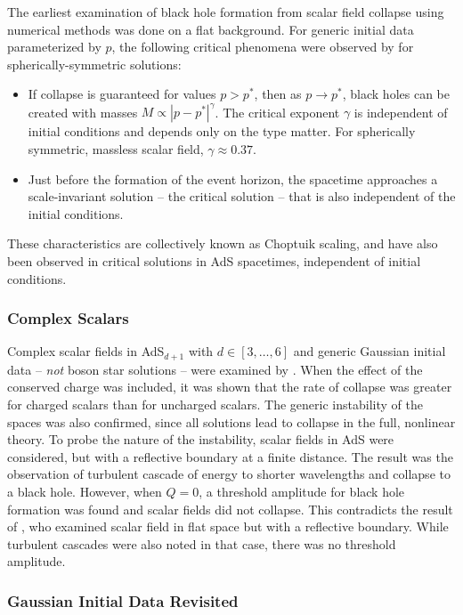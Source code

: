 \documentclass[../PhD.tex]{subfiles}
\begin{document}
The earliest examination of black hole formation from scalar field collapse using numerical methods was done on a flat background. For generic initial data parameterized by $p$, the following critical phenomena were observed by \cite{Choptuik:1992jv} for spherically-symmetric solutions:
\begin{itemize}
\item If collapse is guaranteed for values $p > p^*$, then as $p \to p^*$, black holes can be created with masses $M \propto |p - p^*|^\gamma$. The critical exponent $\gamma$ is independent of initial conditions and depends only on the type matter. For spherically symmetric, massless scalar field, $\gamma \approx 0.37$.
\item Just before the formation of the event horizon, the spacetime approaches a scale-invariant solution -- the critical solution -- that is also independent of the initial conditions.
\end{itemize}

These characteristics are collectively known as Choptuik scaling, and have also been observed in critical solutions in AdS spacetimes, independent of initial conditions.

\subsubsection{Complex Scalars}

Complex scalar fields in AdS$_{d+1}$ with $d \in [3,\ldots,6]$ and generic Gaussian initial data -- \emph{not} boson star solutions -- were examined by \cite{1210.0890}. When the effect of the conserved charge was included, it was shown that the rate of collapse was greater for charged scalars than for uncharged scalars. The generic instability of the spaces was also confirmed, since all solutions lead to collapse in the full, nonlinear theory. To probe the nature of the instability, scalar fields in AdS were considered, but with a reflective boundary at a finite distance. The result was the observation of turbulent cascade of energy to shorter wavelengths and collapse to a black hole. However, when $Q = 0$, a threshold amplitude for black hole formation was found and scalar fields did not collapse. This contradicts the result of \cite{1208.2934}, who examined scalar field in flat space but with a reflective boundary. While turbulent cascades were also noted in that case, there was no threshold amplitude.

\subsubsection{Gaussian Initial Data Revisited}
\end{document}
